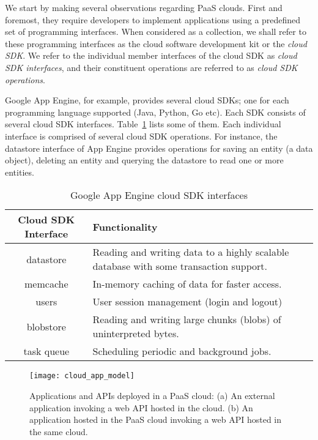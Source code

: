 We start by making several observations regarding PaaS clouds. First and foremost, 
they require developers
to implement applications using a predefined set of programming interfaces. When considered as a
collection, we shall refer to these programming interfaces as the cloud software development 
kit or the \textit{cloud SDK}. We refer to the individual member interfaces of the cloud SDK
as \textit{cloud SDK interfaces}, and their constituent operations are referred to as \textit{cloud SDK operations}.

Google App Engine, for example, provides several cloud SDKs; one for each
programming language supported (Java, Python, Go etc). Each SDK consists of
several cloud SDK interfaces. Table~\ref{tab:gae_cloud_sdk} lists some of them.
Each individual interface is comprised of several cloud SDK operations. For instance, the 
datastore interface of App Engine provides operations for saving an entity (a data object),
deleting an entity and querying the datastore to read one or more entities.

\begin{table}[htdp]
\caption{Google App Engine cloud SDK interfaces}
\begin{center}
\begin{tabular}{|c|p{5cm}|}
\hline
Cloud SDK Interface & Functionality \\ \hline
datastore & Reading and writing data to a highly scalable database with some transaction support. \\ \hline
memcache & In-memory caching of data for faster access.\\ \hline
users & User session management (login and logout)\\ \hline
blobstore & Reading and writing large chunks (blobs) of uninterpreted bytes.\\ \hline
task queue & Scheduling periodic and background jobs.\\ \hline
\end{tabular}
\end{center}
\label{tab:gae_cloud_sdk}
\end{table}

\begin{figure}
\centering
\texttt{[image: cloud\_app\_model]}
\caption{Applications and APIs deployed in a PaaS cloud: (a) An external application invoking a web API hosted in the cloud. 
(b) An application hosted in the PaaS cloud invoking a web API hosted in the same cloud.}
\label{fig:cloud_app_model}
\end{figure}

